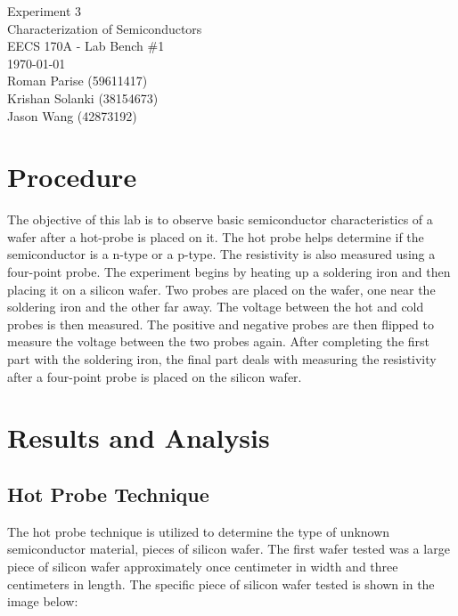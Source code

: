 \documentclass{article}
\begin{document}
	\begin{titlepage}
		\centering
		\Huge{Experiment 3} \\
		\huge{Characterization of Semiconductors} \\
		\vspace{1cm}
		\large{EECS 170A - Lab Bench \#1} \\
		\large{\today} \\
		\vspace{1cm}
		\normalsize{Roman Parise (59611417)} \\
		\normalsize{Krishan Solanki (38154673)} \\
		\normalsize{Jason Wang (42873192)} \\
	\end{titlepage}
	\section{Procedure}
The objective of this lab is to observe basic semiconductor characteristics of a wafer after a hot-probe is placed on it. The hot probe helps determine if the semiconductor is a n-type or a p-type. The resistivity is also measured using a four-point probe. The experiment begins by heating up a soldering iron and then placing it on a silicon wafer. Two probes are placed on the wafer, one near the soldering iron and the other far away. The voltage between the hot and cold probes is then measured. The positive and negative probes are then flipped to measure the voltage between the two probes again. After completing the first part with the soldering iron, the final part deals with measuring the resistivity after a four-point probe is placed on the silicon wafer. \\

	\section{Results and Analysis}
	\subsection{Hot Probe Technique}
	The hot probe technique is utilized to determine the type of unknown semiconductor material, pieces of silicon wafer. The first wafer tested was a large piece of silicon wafer approximately once centimeter in width and three centimeters in length. The specific piece of silicon wafer tested is shown in the image below:
	
\end{document}

